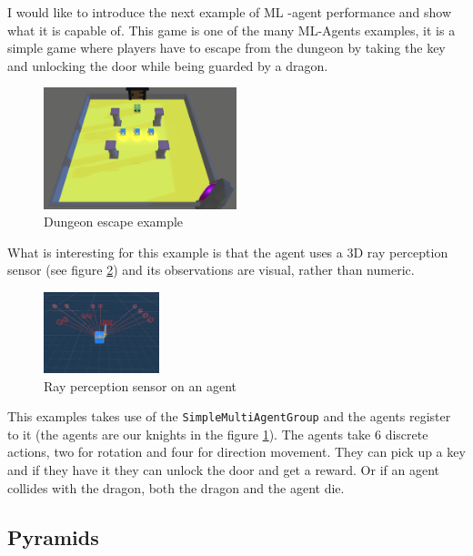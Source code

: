 \documentclass[a4paper,12pt,openright]{book}
\begin{document}
I would like to introduce the next example of ML -agent performance and show what it is capable of. This game is one of the many ML-Agents \cite{MLAgents} examples, it is a simple game where players have to escape from the dungeon by taking the key and unlocking the door while being guarded by a dragon.

\begin{figure}[h]
\begin{center}
\includegraphics[width=0.5\textwidth]{Images/DungeonEscape.png}
\end{center}
\caption{Dungeon escape example \cite{MLAgents}}
\label{pic11}
\end{figure}

What is interesting for this example is that the agent uses a 3D ray perception sensor (see figure \ref{pic12}) and its observations are visual, rather than numeric.

\begin{figure}[h]
\begin{center}
\includegraphics[width=0.3\textwidth]{Images/AgentDungeonEscape.png}
\end{center}
\caption{Ray perception sensor on an agent}
\label{pic12}
\end{figure}

This examples takes use of the \texttt{SimpleMultiAgentGroup} and the agents register to it (the agents are our knights in the figure \ref{pic11}). The agents take 6 discrete actions, two for rotation and four for direction movement. They can pick up a key and if they have it they can unlock the door and get a reward. Or if an agent collides with the dragon, both the dragon and the agent die.

\subsection{Pyramids}
\end{document}
